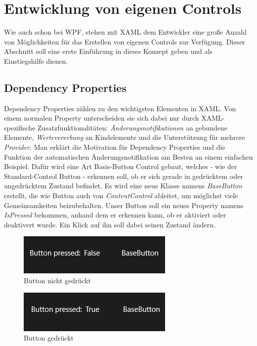 \documentclass[a4paper,bibtotoc,oneside]{scrbook}
\begin{document}
\section[Entwicklung von eigenen Controls]{Entwicklung von eigenen Controls}
Wie auch schon bei WPF, stehen mit XAML dem Entwickler eine große Anzahl von Möglichkeiten für das Erstellen von eigenen Controls zur Verfügung. Dieser Abschnitt soll eine erste Einführung in dieses Konzept geben und als Einstiegshilfe dienen.
\subsection[Dependency Properties]{Dependency Properties}\label{ref:dependencyprops}
Dependency Properties zählen zu den wichtigsten Elementen in XAML. Von einem normalen Property unterscheiden sie sich dabei nur durch XAML-spezifische Zusatzfunktionalitäten: \textit{Änderungsnotifikationen} an gebundene Elemente, \textit{Wertevererbung} an Kindelemente und die Unterstützung für mehrere \textit{Provider}. 
Man erklärt die Motivation für Dependency Properties und die Funktion der automatischen Änderungsnotifikation am Besten an einem einfachen Beispiel.
\newline
\newline
Dafür wird eine Art Basis-Button Control gebaut, welches - wie der Standard-Control Button - erkennen soll, ob er sich gerade in gedrücktem oder ungedrücktem Zustand befindet. Es wird eine neue Klasse namens \textit{BaseButton} erstellt, die wie Button auch von \textit{ContentControl} ableitet, um möglichst viele Gemeinsamkeiten beizubehalten. Unser Button soll ein neues Property namens \textit{IsPressed} bekommen, anhand dem er erkennen kann, ob er aktiviert oder deaktivert wurde. Ein Klick auf ihn soll dabei seinen Zustand ändern.
\newline
\newline
\begin{figure}[htbp]
\centering
\includegraphics[scale=1]{images/buttonpressed_false.png}
\caption[Button nicht gedrückt]{Button nicht gedrückt}\label{Abb5}
\end{figure}
\newline
\newline
\begin{figure}[htbp]
\centering
\includegraphics[scale=1]{images/buttonpressed_true.png}
\caption[Button gedrückt]{Button gedrückt}\label{Abb6}
\end{figure}
\end{document}
